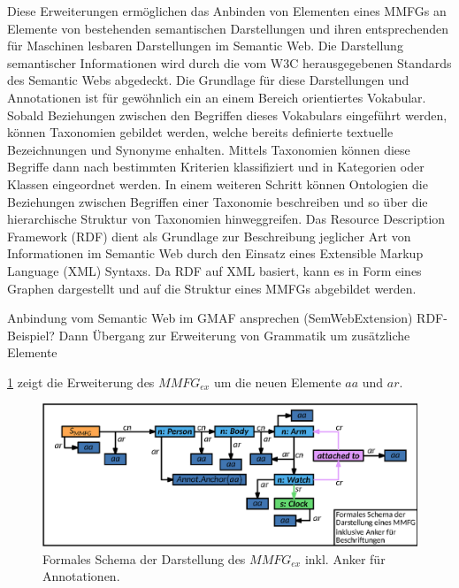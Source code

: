 Diese Erweiterungen ermöglichen das Anbinden von Elementen eines MMFGs an Elemente von bestehenden semantischen Darstellungen und ihren entsprechenden für Maschinen lesbaren Darstellungen im Semantic Web.
Die Darstellung semantischer Informationen wird durch die vom W3C herausgegebenen Standards des Semantic Webs abgedeckt.
Die Grundlage für diese Darstellungen und Annotationen ist für gewöhnlich ein an einem Bereich orientiertes Vokabular.
Sobald Beziehungen zwischen den Begriffen dieses Vokabulars eingeführt werden, können Taxonomien gebildet werden, welche bereits definierte textuelle Bezeichnungen und Synonyme enhalten.
Mittels Taxonomien können diese Begriffe dann nach bestimmten Kriterien klassifiziert und in Kategorien oder Klassen eingeordnet werden.
In einem weiteren Schritt können Ontologien die Beziehungen zwischen Begriffen einer Taxonomie beschreiben und so über die hierarchische Struktur von Taxonomien hinweggreifen.
Das Resource Description Framework (RDF) dient als Grundlage zur Beschreibung jeglicher Art von Informationen im Semantic Web durch den Einsatz eines Extensible Markup Language (XML) Syntaxs.
Da RDF auf XML basiert, kann es in Form eines Graphen dargestellt und auf die Struktur eines MMFGs abgebildet werden.

Anbindung vom Semantic Web im GMAF ansprechen (SemWebExtension)
RDF-Beispiel?
Dann Übergang zur Erweiterung von Grammatik um zusätzliche Elemente

\cref{sec2:sota:subsec:fz-explainablity:fig:mmfg-formal-schema-mmfg-ex-incl-annotation} zeigt die Erweiterung des $MMFG_{ex}$ um die neuen Elemente $aa$ und $ar$.

\begin{figure}[htb]
    \centering
    \includegraphics[width=\textwidth]{chapter/chapter_2/mmfg/annotation/formal-schema-mmfg-ex-incl-annotation.eps}
    \caption{Formales Schema der Darstellung des $MMFG_{ex}$ inkl. Anker für Annotationen.}
    \label{sec2:sota:subsec:fz-explainablity:fig:mmfg-formal-schema-mmfg-ex-incl-annotation}
\end{figure}

